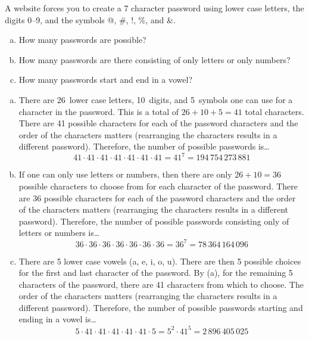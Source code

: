 \documentclass[11pt,letterpaper]{article}
\begin{document}

 A website forces you to create a 7 character password using lower case letters, the digits 0--9, and the symbols @, \#, !, \%, and \&. 
	\begin{enumerate}[(a)]
	\item How many passwords are possible?
	\item How many passwords are there consisting of only letters or only numbers?
	\item How many passwords start and end in a vowel?
	\end{enumerate} \pspace

\sol 
\begin{enumerate}[(a)]
\item There are 26~lower case letters, 10~digits, and 5~symbols one can use for a character in the password. This is a total of $26 + 10 + 5= 41$ total characters. There are 41 possible characters for each of the password characters and the order of the characters matters (rearranging the characters results in a different password). Therefore, the number of possible passwords is\dots
	\[
	41 \cdot 41 \cdot 41 \cdot 41 \cdot 41 \cdot 41 \cdot 41= 41^7= 194\,754\,273\,881
	\] \pspace

\item If one can only use letters or numbers, then there are only $26 + 10= 36$ possible characters to choose from for each character of the password. There are 36 possible characters for each of the password characters and the order of the characters matters (rearranging the characters results in a different password). Therefore, the number of possible passwords consisting only of letters or numbers is\dots
	\[
	36 \cdot 36 \cdot 36 \cdot 36 \cdot 36 \cdot 36 \cdot 36= 36^7= 78\,364\,164\,096
	\] \pspace

\item There are 5 lower case vowels (a, e, i, o, u). There are then 5 possible choices for the first and last character of the password. By (a), for the remaining 5 characters of the password, there are 41 characters from which to choose. The order of the characters matters (rearranging the characters results in a different password). Therefore, the number of possible passwords starting and ending in a vowel is\dots
	\[
	5 \cdot 41 \cdot 41 \cdot 41 \cdot 41 \cdot 41 \cdot 5= 5^2 \cdot 41^5= 2\,896\,405\,025
	\]
\end{enumerate}
\end{document}

